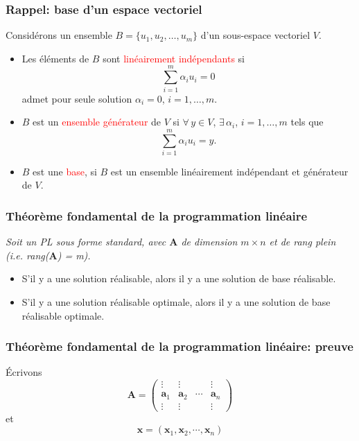 \documentclass[usepdftitle=false]{beamer}
\def\ba{\boldsymbol{a}}
\def\bx{\boldsymbol{x}}
\def\bA{\boldsymbol{A}}
\begin{document}
\begin{frame}
\frametitle{Rappel: base d'un espace vectoriel}

Considérons un ensemble $B = \lbrace u_1, u_2,\ldots, u_m \rbrace$ d'un sous-espace vectoriel $V$.

\begin{itemize}
\item 
Les éléments de $B$ sont \textcolor{red}{linéairement indépendants} si
$$
\sum_{i=1}^m \alpha_i u_i = 0
$$
admet pour seule solution $\alpha_i = 0$, $i = 1,\ldots,m$.
\item
$B$ est un \textcolor{red}{ensemble générateur} de $V$ si $\forall\, y \in V$, $\exists\, \alpha_i$, $i = 1,\ldots,m$ tels que
$$
\sum_{i=1}^m \alpha_i u_i = y.
$$
\item
$B$ est une \textcolor{red}{base}, si $B$ est un ensemble linéairement indépendant et générateur
de $V$.
\end{itemize}

\end{frame}

\begin{frame}
\frametitle{Théorème fondamental de la programmation linéaire}

{\it
Soit un PL sous forme standard, avec $\bA$ de dimension $m \times n$ et de rang plein (i.e. rang($\bA$) = m).
\begin{itemize}
\item
S'il y a une solution réalisable, alors il y a une solution de base réalisable.
\item
S'il y a une solution réalisable optimale, alors il y a une solution de base réalisable optimale.
\end{itemize}
}

\end{frame}

\begin{frame}
\frametitle{Théorème fondamental de la programmation linéaire: preuve}

Écrivons
\[
\bA =
\begin{pmatrix}
\vdots & \vdots & & \vdots \\
\ba_1 & \ba_2 & \cdots & \ba_n \\
\vdots & \vdots & & \vdots
\end{pmatrix}
\]
et
\[
\bx = ( \bx_1, \bx_2, \cdots, \bx_n )
\]
\end{frame}
\end{document}
